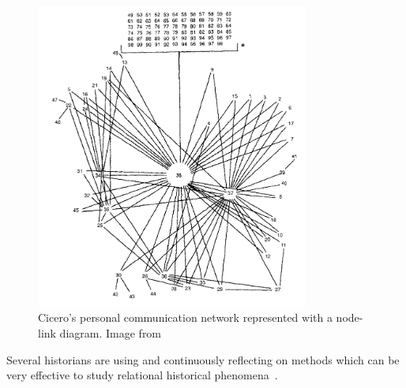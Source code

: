 \begin{figure}[!ht]
    \centering %
    \includegraphics[width=0.8\textwidth]{static/figures/RelatedWork/Cicero_network}
    \caption{Cicero's personal communication network represented with a node-link diagram. Image from \cite{alexanderAnalysisAncientNetwork1990}}
    \label{fig:cicero-letters}
\end{figure}


Several historians are using and continuously reflecting on \hsna methods\cite{cristofoliAuxSourcesGrands2008, lemercier12FormalNetwork2015} which can be very effective to study relational historical phenomena~\cite{kerschbaumerPowerNetworksProspects2015}.




